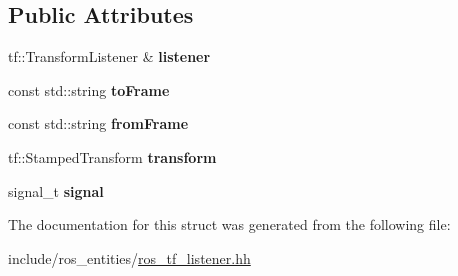 \subsection*{Public Attributes}
\begin{DoxyCompactItemize}
\item 
\mbox{\label{structdynamic__graph_1_1internal_1_1TransformListenerData_ae83ed824d8e7350c639d3a4b8f8c7c51}} 
tf\+::\+Transform\+Listener \& {\bfseries listener}
\item 
\mbox{\label{structdynamic__graph_1_1internal_1_1TransformListenerData_a35c066b704b49bad5319aeefd6955edf}} 
const std\+::string {\bfseries to\+Frame}
\item 
\mbox{\label{structdynamic__graph_1_1internal_1_1TransformListenerData_a95d5dd80a8b2eb36e42515c5e20ea514}} 
const std\+::string {\bfseries from\+Frame}
\item 
\mbox{\label{structdynamic__graph_1_1internal_1_1TransformListenerData_a79d1956bbae0f50368633551cee1995b}} 
tf\+::\+Stamped\+Transform {\bfseries transform}
\item 
\mbox{\label{structdynamic__graph_1_1internal_1_1TransformListenerData_aa8e36737907c1f68321dd2535cf11620}} 
signal\+\_\+t {\bfseries signal}
\end{DoxyCompactItemize}


The documentation for this struct was generated from the following file\+:\begin{DoxyCompactItemize}
\item 
include/ros\+\_\+entities/\hyperlink{ros__tf__listener_8hh}{ros\+\_\+tf\+\_\+listener.\+hh}\end{DoxyCompactItemize}
